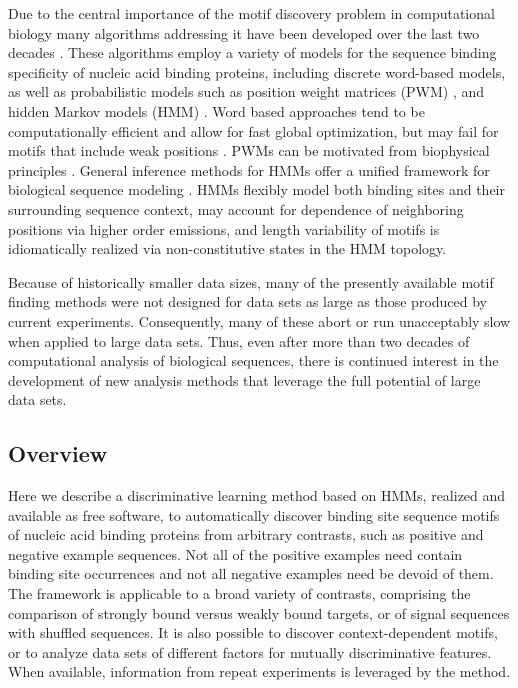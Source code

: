 \documentclass[a4paper]{article}
\begin{document}
Due to the central importance of the motif discovery problem in computational biology many algorithms addressing it have been developed over the last two decades \cite{Das2007}.
These algorithms employ  a variety of models for the sequence binding specificity of nucleic acid binding proteins, including discrete word-based models, as well as probabilistic models such as position weight matrices (PWM) \cite{Stormo1998}, and hidden Markov models (HMM) \cite{Rabiner1989}.
Word based approaches tend to be computationally efficient and allow for fast global optimization, but may fail for motifs that include weak positions \cite{Das2007}.
PWMs can be motivated from biophysical principles \cite{Berg1987,Stormo2000,Foat2006}.
General inference methods for HMMs offer a unified framework for biological sequence modeling \cite{Durbin1998}.
HMMs flexibly model both binding sites and their surrounding sequence context, may account for dependence of neighboring positions via higher order emissions, and length variability of motifs is idiomatically realized via non-constitutive states in the HMM topology.

Because of historically smaller data sizes, many of the presently available motif finding methods were not designed for data sets as large as those produced by current experiments.
Consequently, many of these abort or run unacceptably slow when applied to large data sets.
Thus, even after more than two decades of computational analysis of biological sequences, there is continued interest in the development of new analysis methods that leverage the full potential of large data sets.

\subsection{Overview}
Here we describe a discriminative learning method based on HMMs, realized and available as free software, to automatically discover binding site sequence motifs of nucleic acid binding proteins from arbitrary contrasts,
such as positive and negative example sequences.
Not all of the positive examples need contain binding site occurrences and not all negative examples need be devoid of them.
The framework is applicable to a broad variety of contrasts, comprising the comparison of strongly bound versus weakly bound targets, or of signal sequences with shuffled sequences.
It is also possible to discover context-dependent motifs, or to analyze data sets of different factors for mutually discriminative features.
When available, information from repeat experiments is leveraged by the method.
\end{document}
